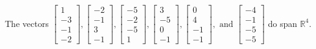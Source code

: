 \begin{exercise}
\begin{exerciseStatement}
  \end{exerciseStatement}
  \begin{exerciseAnswer}
   The vectors \(\left[\begin{array}{r}
1 \\
-3 \\
-1 \\
-2
\end{array}\right] , \left[\begin{array}{r}
-2 \\
-1 \\
3 \\
-1
\end{array}\right] , \left[\begin{array}{r}
-5 \\
-2 \\
-5 \\
1
\end{array}\right] , \left[\begin{array}{r}
3 \\
-5 \\
0 \\
-1
\end{array}\right] , \left[\begin{array}{r}
0 \\
4 \\
-1 \\
-1
\end{array}\right] , \text{ and } \left[\begin{array}{r}
-4 \\
-1 \\
-5 \\
-5
\end{array}\right]\) 
  	 do  
	span \(\mathbb{R}^4\).
  


  \end{exerciseAnswer}
\end{exercise}